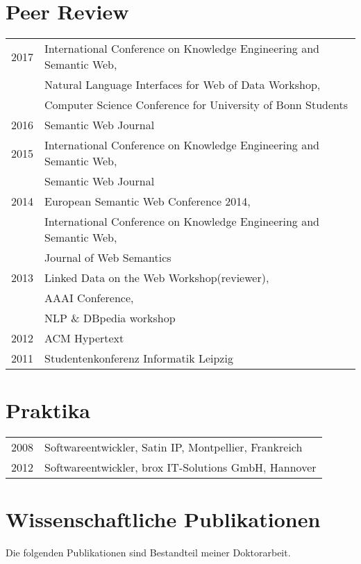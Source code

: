 \documentclass{article}
\begin{document}
\section*{Peer Review}
\begin{tabular}{p{3cm}p{10cm}}
2017    &International Conference on Knowledge Engineering and Semantic Web,\\
	&Natural Language Interfaces for Web of Data Workshop,\\
	&Computer Science Conference for University of Bonn Students\\
2016	&Semantic Web Journal\\
2015    &International Conference on Knowledge Engineering and Semantic Web,\\
	&Semantic Web Journal\\
2014	&European Semantic Web Conference 2014,\\
	&International Conference on Knowledge Engineering and Semantic Web,\\
	&Journal of Web Semantics\\
2013	&Linked Data on the Web Workshop(reviewer),\\
	&AAAI Conference,\\
	&NLP \& DBpedia workshop\\
2012	&ACM Hypertext\\
2011	&Studentenkonferenz Informatik Leipzig
\end{tabular}

\section*{Praktika}
\begin{tabular}{p{3cm}p{10cm}}
2008    &Softwareentwickler, Satin IP, Montpellier, Frankreich\\
2012    &Softwareentwickler, brox IT-Solutions GmbH, Hannover\\
\end{tabular}

\section*{Wissenschaftliche Publikationen}
Die folgenden Publikationen sind Bestandteil meiner Doktorarbeit.
\bigskip
\end{document}
